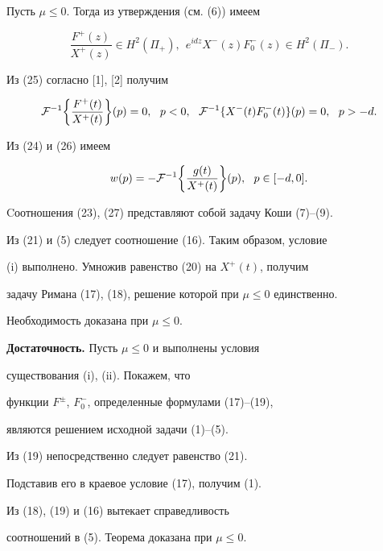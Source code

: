 Пусть $\mu\leq 0$. Тогда из утверждения (см. (6)) имеем


\begin{equation}


\frac{F^+(z)}{X^+(z)}\in H^2(\Pi_+),\ \ e^{id z}X^-(z)F_0^-(z)\in H^2(\Pi_-).


\end{equation}


Из (25) согласно [1], [2] получим


\begin{equation}


{\cal F}^{-1}\bigg\{\frac{F^+(t)}{X^+(t)}\bigg\}(p)=0,\ \ p<0,


\ \ {\cal F}^{-1}\{X^-(t)F^-_0(t)\}(p) =0,\ \ p>-d.


\end{equation}


Из (24) и (26) имеем


\begin{equation}


w(p)= -{\cal F}^{-1}\bigg\{\frac{g(t)}{X^+(t)}\bigg\}(p),\ \ p\in [-d,0].


\end{equation}


Cоотношения (23), (27) представляют собой задачу Коши (7)--(9).


Из (21) и (5) следует соотношение (16). Таким образом, условие


(i) выполнено. Умножив равенство (20) на $X^+(t)$, получим


задачу Римана (17), (18), решение которой при $\mu\leq 0$ единственно.


Необходимость доказана при $\mu\leq 0$.





{\bf Достаточность.} Пусть $\mu\leq 0$ и выполнены условия 


существования (i), (ii). Покажем, что


функции $F^\pm$, $F_0^-$, определенные формулами (17)--(19),


являются решением исходной задачи (1)--(5).





Из (19) непосредственно следует равенство (21).


Подставив его в краевое условие (17), получим (1). 


Из (18), (19) и (16) вытекает справедливость


соотношений в (5). Теорема доказана при $\mu\leq 0$.





